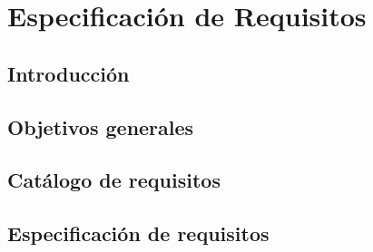 \chapter{Especificación de Requisitos}
\label{cha:Especificación de Requisitos}

\section{Introducción}

\section{Objetivos generales}

\section{Catálogo de requisitos}

\section{Especificación de requisitos}
